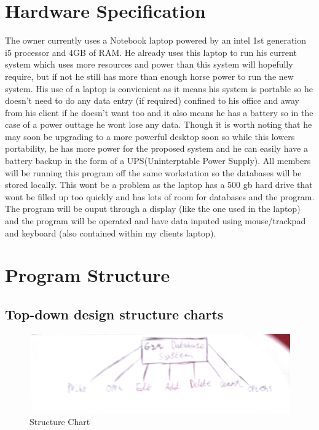 \section{Hardware Specification}

The owner currently uses a Notebook laptop powered by an intel 1st generation
i5 processor and 4GB of RAM. He already uses this laptop to run his current
system which uses more resources and power than this system will hopefully
require, but if not he still has more than enough horse power to run the new
system. His use of a laptop is convienient as it means his system is portable
so he doesn’t need to do any data entry (if required) confined to his office and
away from his client if he doesn’t want too and it also means he has a battery so
in the case of a power outtage he wont lose any data. Though it is worth noting
that he may soon be upgrading to a more powerful desktop soon so while this
lowers portability, he has more power for the proposed system and he can easily
have a battery backup in the form of a UPS(Uninterptable Power Supply).
All members will be running this program off the same workstation so the
databases will be stored locally. This wont be a problem as the laptop has a 500 gb hard drive that wont be filled up too quickly and has lots of room for databases and the program. The program will be ouput through a display (like the one used in the laptop) and the program will be operated and have data inputed using mouse/trackpad and keyboard (also contained within my clients laptop). 



\section{Program Structure}

\subsection{Top-down design structure charts}

\begin{figure}[H]
    \includegraphics[width=\textwidth]{StructureChart1.jpg}
    \caption{Structure Chart} \label{fig:StructureChart}
\end{figure}

